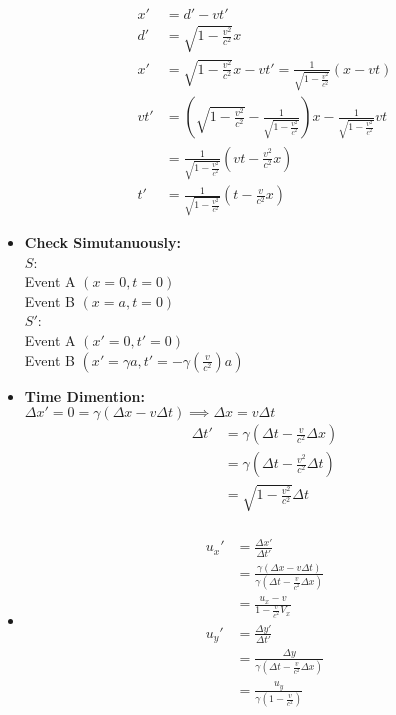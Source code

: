 \documentclass[fleqn,a4paper,12pt]{article}
\begin{document}
\begin{itemize}
\begin{tikzpicture}
\end{tikzpicture}

    \begin{align*}
      x' &= d' - vt' \\
      d' &= \sqrt{ 1 - \frac{v^2}{c^2} } x \\
      x' &= \sqrt{ 1 - \frac{v^2}{c^2} } x - vt' = \frac {1}{\sqrt{ 1 - \frac{v^2}{c^2} }} (x-vt)\\
      vt' &= ( \sqrt{ 1 - \frac{v^2}{c^2} } -\frac{1}{\sqrt{ 1 - \frac{v^2}{c^2} }} )x - \frac{1}{\sqrt{ 1 - \frac{v^2}{c^2} }}vt\\
      &= \frac {1}{ \sqrt{ 1 - \frac{v^2}{c^2} } } ( vt - \frac{v^2}{c^2} x )\\
      t' &= \frac {1}{ \sqrt{ 1 - \frac{v^2}{c^2} } } ( t - \frac{v}{c^2} x )
    \end{align*}
    
  \item
    \textbf{Check Simutanuously:}\\
    $S$:\\
    Event A $(x = 0, t = 0 ) $\\
    Event B $(x = a, t = 0 ) $\\
    $S'$:\\
    Event A $(x' = 0, t' = 0 )$\\
    Event B $(x' = \gamma a , t' = -\gamma (\frac {v}{c^2}) a  )$\\
  \item
    \textbf{Time Dimention:}\\
    $\Delta x' = 0 = \gamma ( \Delta x - v \Delta t ) \implies \Delta x = v \Delta t$
    \begin{align*}
      \Delta t' &= \gamma ( \Delta t - \frac{v}{c^2} \Delta x ) \\
                &= \gamma ( \Delta t - \frac{v^2}{c^2} \Delta t ) \\
                &= \sqrt { 1 - \frac{v^2}{c^2} } \Delta t \\
    \end{align*}

  \item
    \begin{align*}
      {u_x}' &= \frac { \Delta x' }{ \Delta t' }\\
         &= \frac { \gamma (\Delta x - v \Delta t ) }{ \gamma ( \Delta t - \frac{v}{c^2} \Delta x ) }\\
         &= \frac { u_x -v }{ 1 - \frac {v}{c^2} V_x } \\
      {u_y}' &= \frac { \Delta y' }{ \Delta t' } \\
             &= \frac { \Delta y }{ \gamma ( \Delta t - \frac{ v }{ c^2 } \Delta x ) } \\
             &= \frac { u_y }{ \gamma( 1 - \frac{v}{c^2} ) }
    \end{align*}
    

\end{itemize}
\end{document}
